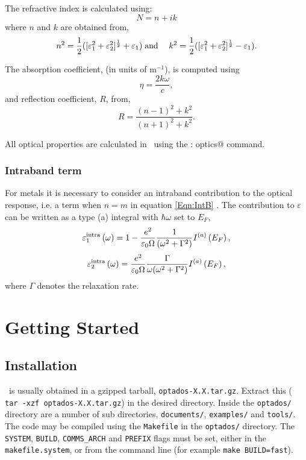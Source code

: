 \documentclass[a4paper,11pt,twoside]{book}
\begin{document}
{The refractive index is calculated using:
\begin{equation}
N=n+ik
\end{equation}
where $n$ and $k$ are obtained from,
\begin{eqnarray}
n^2=\frac{1}{2}([\varepsilon_1^2+\varepsilon_2^2]^{\frac{1}{2}}+\varepsilon_1)
& {\rm \;and\;}&
k^2=\frac{1}{2}([\varepsilon_1^2+\varepsilon_2^2]^{\frac{1}{2}}-\varepsilon_1).
\end{eqnarray}


The absorption coefficient, (in units of m$^{-1}$), is computed using
\begin{equation}
\eta = \frac{2k\omega}{c},
\end{equation}
and reflection coefficient, $R$, from,
\begin{equation}
R= \frac{(n-1)^2 + k^2}{(n+1)^2+k^2}.
\end{equation}

All optical properties are calculated in \optados\ using the \verb@task : optics@ command.

\subsection{Intraband term}
For metals it is necessary to consider an intraband contribution to
the optical response, i.e. a term when $n = m$ in equation
\ref{Eqn:IntB}  \cite{dressel,draxl}.  The contribution to
$\varepsilon$ can be written as a type (a) integral with $\hbar\omega$
set to $E_F$,
\begin{equation}
\varepsilon_1^{\rm{intra}} \left ( \omega \right ) = 1 - \frac{e^2}{\varepsilon_0 \Omega} \frac{1}{(\omega^2+\Gamma^2)} I^{(a)}\left ( E_F \right ),
\end{equation}
\begin{equation}
\varepsilon_2^{\rm{intra}} \left ( \omega \right ) = \frac{e^2}{\varepsilon_0 \Omega}\frac{\Gamma}{\omega (\omega^2+\Gamma^2)} I^{(a)}\left ( E_F \right ),
\end{equation}
where $\Gamma$ denotes the relaxation rate.



\chapter{Getting Started}\label{chap:getting_started}
\section{Installation}
\optados\ is usually obtained in a gzipped tarball, \verb#optados-X.X.tar.gz#. Extract this ( \verb# tar -xzf optados-X.X.tar.gz#) in the desired directory. Inside the  \verb#optados/# directory are a number of sub directories,  \verb#documents/#,   \verb#examples/# and \verb#tools/#.  The code may be compiled using the \verb#Makefile# in the  \verb#optados/# directory.  The \verb#SYSTEM#, \verb#BUILD#, \verb#COMMS_ARCH# and \verb#PREFIX# flags must be set, either in the  \verb#makefile.system#, or from the command line (for example  \verb#make BUILD=fast#).

}
\end{document}
